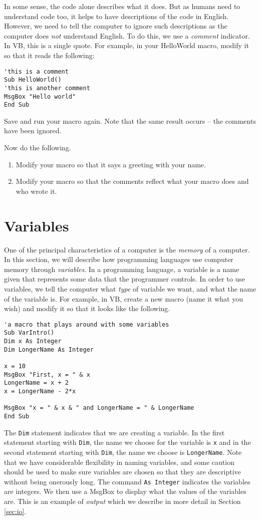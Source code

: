 \documentclass[10pt]{article}
\begin{document}
In some sense, the code alone describes what it does. But as humans need to understand code too, it helps to have descriptions of the code in English. However, we need to tell the computer to ignore such descriptions as the computer does {\it not} understand English. To do this, we use a {\it comment} indicator. In VB, this is a single quote. For example, in your HelloWorld macro, modify it so that it reads the following: 
\begin{verbatim}
'this is a comment
Sub HelloWorld()
'this is another comment
MsgBox "Hello world"
End Sub
\end{verbatim}
Save and run your macro again. Note that the same result occurs -- the comments have been ignored.

Now do the following.
\begin{enumerate}
\item Modify your macro so that it says a greeting with your name.
\item Modify your macro so that the comments reflect what your macro does and who wrote it.
\end{enumerate}


\section{Variables}
\label{sec:vars}
One of the principal characteristics of a computer is the {\it memory} of a computer. In this section, we will describe how programming languages use computer memory through {\it variables}. In a programming language, a variable is a name given that represents some data that the programmer controls. In order to use variables, we tell the computer what {\it type} of variable we want, and what the name of the variable is. For example, in VB, create a new macro (name it what you wish) and modify it so that it looks like the following.
\begin{verbatim}
'a macro that plays around with some variables
Sub VarIntro()
Dim x As Integer
Dim LongerName As Integer

x = 10
MsgBox "First, x = " & x 
LongerName = x + 2
x = LongerName - 2*x

MsgBox "x = " & x & " and LongerName = " & LongerName
End Sub
\end{verbatim}
The {\tt Dim} statement indicates that we are creating a variable. In the first statement starting with {\tt Dim}, the name we choose for the variable is {\tt x} and in the second statement starting with {\tt Dim}, the name we choose is {\tt LongerName}. Note that we have considerable flexibility in naming variables, and some caution should be used to make sure variables are chosen so that they are descriptive without being onerously long. The command {\tt As Integer} indicates the variables are integers. We then use a MsgBox to display what the values of the variables are. This is an example of {\it output} which we describe in more detail in Section \ref{sec:io}.
\end{document}
